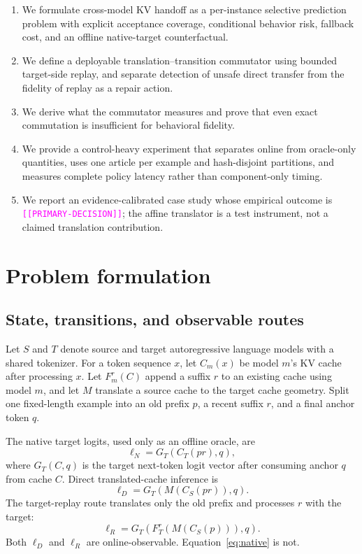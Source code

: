 \documentclass[10pt,twocolumn]{article}
\newcommand{\result}[1]{\textcolor{magenta}{\texttt{[[#1]]}}}
\begin{document}
\begin{enumerate}[leftmargin=*,itemsep=2pt]
  \item We formulate cross-model KV handoff as a per-instance selective
  prediction problem with explicit acceptance coverage, conditional behavior
  risk, fallback cost, and an offline native-target counterfactual.
  \item We define a deployable translation--transition commutator using
  bounded target-side replay, and separate detection of unsafe direct
  transfer from the fidelity of replay as a repair action.
  \item We derive what the commutator measures and prove that even exact
  commutation is insufficient for behavioral fidelity.
  \item We provide a control-heavy experiment that separates online from
  oracle-only quantities, uses one article per example and hash-disjoint
  partitions, and measures complete policy latency rather than component-only
  timing.
  \item We report an evidence-calibrated case study whose empirical outcome is
  \result{PRIMARY-DECISION}; the affine translator is a test instrument, not a
  claimed translation contribution.
\end{enumerate}

\section{Problem formulation}

\subsection{State, transitions, and observable routes}

Let $S$ and $T$ denote source and target autoregressive language models with a
shared tokenizer.  For a token sequence $x$, let $C_m(x)$ be model $m$'s KV
cache after processing $x$.  Let $F_m^r(C)$ append a suffix $r$ to an existing
cache using model $m$, and let $M$ translate a source cache to the target cache
geometry.  Split one fixed-length example into an old prefix $p$, a recent
suffix $r$, and a final anchor token $q$.

The native target logits, used only as an offline oracle, are
\begin{equation}
  \ell_N = G_T(C_T(pr),q),
  \label{eq:native}
\end{equation}
where $G_T(C,q)$ is the target next-token logit vector after consuming anchor
$q$ from cache $C$.  Direct translated-cache inference is
\begin{equation}
  \ell_D = G_T(M(C_S(pr)),q).
  \label{eq:direct}
\end{equation}
The target-replay route translates only the old prefix and processes $r$ with
the target:
\begin{equation}
  \ell_R = G_T(F_T^r(M(C_S(p))),q).
  \label{eq:replay}
\end{equation}
Both $\ell_D$ and $\ell_R$ are online-observable.  Equation~\ref{eq:native} is
not.
\end{document}
